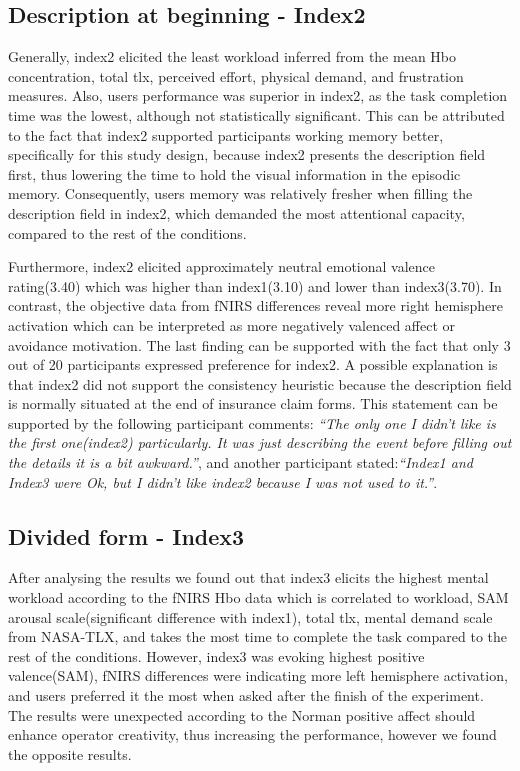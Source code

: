 \documentclass[a4paper]{report}
\begin{document}
		\subsection{Description at beginning - Index2}
			Generally, index2 elicited the least workload inferred from the mean Hbo concentration, total tlx, perceived effort, physical demand, and frustration measures. Also, users performance was superior in index2, as the task completion time was the lowest, although not statistically significant. This can be attributed to the fact that index2 supported participants working memory better, specifically for this study design, because index2 presents the description field first, thus lowering the time to hold the visual information in the episodic memory. Consequently, users memory was relatively fresher when filling the description field in index2, which demanded the most attentional capacity, compared to the rest of the conditions. 
		
			Furthermore, index2 elicited approximately neutral emotional valence rating(3.40) which was higher than index1(3.10) and lower than index3(3.70). In contrast, the objective data from fNIRS differences reveal more right hemisphere activation which can be interpreted as more negatively valenced affect or avoidance motivation. The last finding can be supported with the fact that only 3 out of 20 participants expressed preference for index2. A possible explanation is that index2 did not support the consistency heuristic\cite{nielsen1990heuristic,shneiderman1992designing} because the description field is normally situated at the end of insurance claim forms. This statement can be supported by the following participant comments: \textit{``The only one I didn't like is the first one(index2) particularly. It was just describing the event before filling out the details it is a bit awkward.''}, and another participant stated:\textit{``Index1 and Index3 were Ok, but I didn't like index2 because I was not used to it.''}.
				
		\subsection{Divided form - Index3}
			After analysing the results we found out that index3 elicits the highest mental workload according to the fNIRS Hbo data which is correlated to workload, SAM arousal scale(significant difference with index1), total tlx, mental demand scale from NASA-TLX, and takes the most time to complete the task compared to the rest of the conditions. However, index3 was evoking highest positive valence(SAM), fNIRS differences were indicating more left hemisphere activation, and users preferred it the most when asked after the finish of the experiment. The results were unexpected according to the Norman\cite{norman2002emotion} positive affect should enhance operator creativity, thus increasing the performance, however we found the opposite results. 
		
\end{document}

